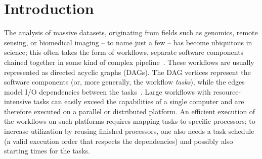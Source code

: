 \documentclass[conference]{IEEEtran}
\newcommand{\skug}[1]{{\color{blue}[SK: #1]}}
\begin{document}
\begin{abstract}



    \end{abstract}


    \section{Introduction} %

%

    The analysis of massive datasets, originating from fields such as genomics, 
    remote sensing, or biomedical imaging -- to name just a few -- has become ubiquitous in science;
    this often takes the form of workflows, \iec separate software components chained together
    in some kind of complex pipeline~\cite{DBLP:journals/dbsk/LeserHDEGHKKKKK21}.
    These workflows are usually represented as directed acyclic graphs (DAGs).
    The DAG vertices represent the software components (or, more generally, the workflow \emph{tasks}),
    while the edges model I/O dependencies between the tasks~\cite{adhikari2019survey,liuPacitti}.
    Large workflows with resource-intensive tasks can easily exceed the capabilities of a 
    single computer and are therefore executed on a parallel or distributed platform.
    An efficient execution of the workflows on such platforms requires mapping tasks
    to specific processors; to increase utilization by reusing finished processors,
    one also needs a task schedule (\iec a valid execution order that respects the dependencies)
    and possibly also starting times for the tasks.
    
\end{document}
